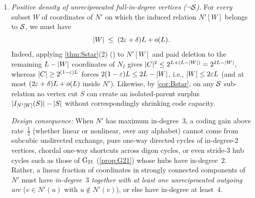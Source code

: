 \begin{enumerate}[label=(N\arabic*),leftmargin=3em]
\item\label{it:con-N1} \emph{Positive density of unreciprocated full-in-degree vertices ($\neg\mathcal{S}$).} For \emph{every}
  subset $W$ of coordinates of $N'$ on which the induced relation $N'[W]$ belongs to $\mathcal{S}$, we must have
  \[
    \lvert W \rvert \;\le\; (2\varepsilon + \delta)L + o(L).
  \]
  Indeed, applying \cref{thm:Sstar}(2) () to $N'[W]$ and paid deletion to the remaining
  $L - \lvert W \rvert$ coordinates of $N_I$ gives $\lvert C \rvert^2 \le 2^{L + (L - \lvert W \rvert)} = 2^{2L - \lvert W \rvert}$, whereas
  $\lvert C \rvert \ge 2^{(1 - \varepsilon)L}$ forces $2(1 - \varepsilon)L \le 2L - \lvert W \rvert$, i.e., $\lvert W \rvert \le 2\varepsilon L$ (and at most
  $(2\varepsilon + \delta)L + o(L)$ inside $N'$). Likewise, by \cref{cor:Bstar}, on any $\mathcal{S}$ sub-relation no vertex cut $S$
  can create an isolated-parent surplus $\lvert I_{N'[W]}(S) \rvert - \lvert S \rvert$ without correspondingly shrinking code capacity.

  \emph{Design consequence:} When $N'$ has maximum in-degree~$3$, a coding gain above rate~$\tfrac{1}{2}$ (whether linear
  or nonlinear, over any alphabet) cannot come from subcubic undirected exchange, pure one-way directed cycles of
  in-degree-$2$ vertices, chordal one-way shortcuts across digon cycles, or even stride-$3$ hub cycles such as those of
  $\mathrm{G}_{21}$ (\cref{prop:G21}) whose hubs have in-degree~$2$. Rather, a linear fraction of coordinates in strongly connected
  components of $N'$ must have \emph{in-degree~$3$ together with at least one unreciprocated outgoing arc} ($v \in N'(u)$
  with $u \notin N'(v)$), or else have in-degree at least~$4$.


\end{enumerate}
